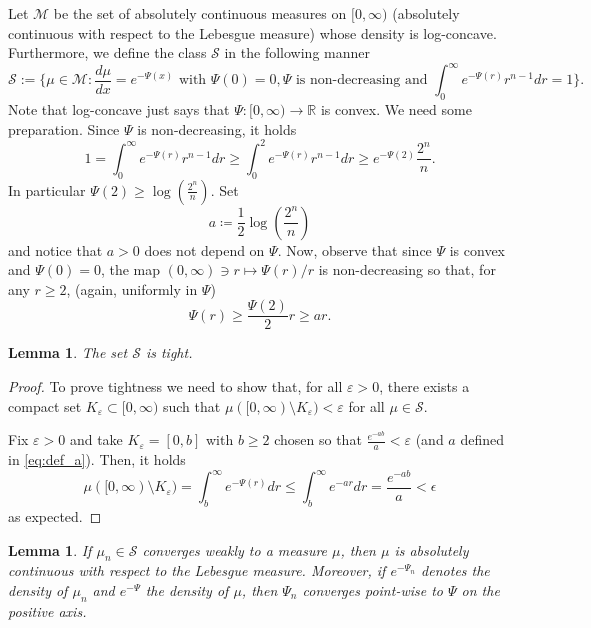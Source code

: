 \documentclass[11pt]{article}
\newtheorem{lemma}[conjecture]{Lemma}
\newcommand{\1}{[1]}
\begin{document}
Let $\mathcal{M}$ be the set of absolutely continuous measures on $[0,\infty)$ (absolutely continuous with respect to the Lebesgue measure) whose density is log-concave. Furthermore, we define the class $\mathcal{S}$ in the following manner 
$$
\mathcal{S} :=\{\mu \in \mathcal{M} :  \frac{d\mu}{dx}=e^{-\Psi(x)}
\mbox{ with } \Psi(0)=0, \Psi \mbox{ is non-decreasing  and } \int_{0}^{\infty}\!e^{-\Psi(r)}r^{n-1}dr=1\} .
$$
Note that log-concave just says that $\Psi \colon [0,\infty) \to \mathbb{R}$ is convex. We need some preparation. 
Since $\Psi$ is non-decreasing, it holds  
    $$
    1
    =
    \int_{0}^{\infty}e^{-\Psi(r)}r^{n-1}dr\geq\int_{0}^{2}e^{-\Psi(r)}r^{n-1}dr
    \geq 
    e^{-\Psi(2)}\frac{2^{n}}{n} .
    $$ 
    In particular $\Psi(2) \geq \log\left(\frac{2^{n}}{n}\right)$. Set 
    \begin{equation} \label{eq:def_a}
      a \coloneqq 
      \frac{1}{2}\log\left(\frac{2^{n}}{n}\right)    
    \end{equation}
    and notice that $a>0$ does not depend on $\Psi$. Now, observe that since $\Psi$ is convex and $\Psi(0)=0$, the map $(0,\infty) \ni r \mapsto \Psi(r)/r$ is non-decreasing so that, for any $r \geq 2$, (again, uniformly in $\Psi$)
    \begin{equation} \label{eq:psi}
    \Psi(r) \geq \frac{\Psi(2)}{2}r \geq ar .
    \end{equation}


\begin{lemma} \label{lem:tight}
    The set $\mathcal{S}$ is tight.
\end{lemma}
\begin{proof}
    To prove tightness we need to show that, for all 
    $\varepsilon>0$, there exists a compact set $K_{\varepsilon} \subset [0,\infty)$ such that $\mu([0,\infty)\setminus K_{\varepsilon})<\varepsilon$ for all $\mu\in\mathcal{S}$.  
    
    Fix $\varepsilon >0$ and take $K_{\varepsilon}=[0,b]$ with $b \geq 2$ chosen so that $\frac{e^{-ab}}{a} < \varepsilon$ (and $a$ defined in \eqref{eq:def_a}). Then, 
    it holds
    $$
    \mu([0,\infty)\setminus K_{\varepsilon})
    =
    \int_{b}^{\infty}e^{-\Psi(r)}dr
    \leq
    \int_{b}^{\infty}e^{-ar}dr
    =
    \frac{e^{-ab}}{a} 
    <
    \epsilon 
    $$
    as expected.
\end{proof} 

\begin{lemma}\label{lem:absolutely-continuous}
If $\mu_{n}\in\mathcal{S}$ converges weakly to a measure $\mu$,  then $\mu$ is absolutely continuous with respect to the Lebesgue measure. Moreover, if $e^{-\Psi_n}$ denotes the density of $\mu_n$ and $e^{-\Psi}$ the density of $\mu$, then $\Psi_n$ converges point-wise to $\Psi$ on the positive axis.
\end{lemma}
\end{document}
